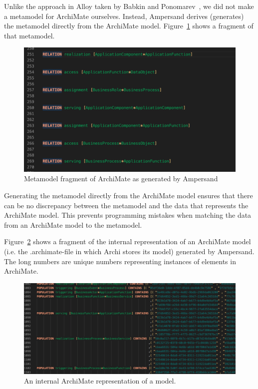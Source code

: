 \documentclass[sn-vancouver]{sn-jnl}%
\theoremstyle{thmstyleone}%
\theoremstyle{thmstyletwo}%
\theoremstyle{thmstylethree}%
\begin{document}
Unlike the approach in Alloy taken by Babkin and Ponomarev~\cite{babkin2017analysis}, we did not make a metamodel for ArchiMate ourselves.
Instead, Ampersand derives (generates) the metamodel directly from the ArchiMate model.
Figure~\ref{meta} shows a fragment of that metamodel.
\begin{figure}[hbtp]
 \centering
\includegraphics[clip=true, scale=0.5]{MetamodelArchiMate generated by ArchiChecker}
\caption{Metamodel fragment of ArchiMate as generated by Ampersand}
\label{meta}   %
\end{figure}
Generating the metamodel directly from the ArchiMate model ensures that there can be no discrepancy between the metamodel and the data that represents the ArchiMate model.
This prevents programming mistakes when matching the data from an ArchiMate model to the metamodel.

Figure~\ref{populated} shows a fragment of the internal representation of an ArchiMate model (i.e. the .archimate-file in which Archi stores its model) generated by Ampersand.
The long numbers are unique numbers representing instances of elements in ArchiMate.
\begin{figure}[hbtp]
 \centering
\includegraphics[clip=true, scale=0.4]{Populated model}
\caption{An internal ArchiMate representation of a model.}
\label{populated}   %
\end{figure}
\end{document}
